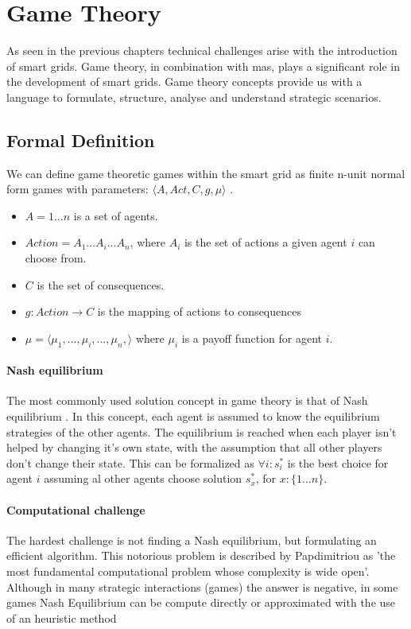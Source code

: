 \section{Game Theory}
As seen in the previous chapters technical challenges arise with the introduction of smart grids. Game theory, in combination with \gls{mas}, plays a significant role in the development of smart grids. Game theory concepts provide us with a language to formulate, structure, analyse and understand strategic scenarios.

\subsection{Formal Definition}
We can define game theoretic games within the smart grid as finite n-unit normal form games with parameters: $\langle A,Act,C,g,\mu \rangle$ \cite{CourseInGameTheory}. \\
\begin{itemize}
    \item $A = {1 ... n }$ is a set of agents.
    \item $Action = A_{1} ... A_{i} ... A_{n}$, where $A_{i}$ is the set of actions a given agent $i$ can choose from.
    \item $C$ is the set of consequences.
    \item $g: Action \to C$ is the mapping of actions to consequences
    \item $\mu = \langle \mu_{1}, ..., \mu_{i}, ..., \mu_{n}, \rangle $ where $\mu_{i}$ is a payoff function for agent $i$.
\end{itemize}


\paragraph{Nash equilibrium} 
The most commonly used solution concept in game theory is that of Nash equilibrium \cite{CourseInGameTheory}. In this concept, each agent is assumed to know the equilibrium strategies of the other agents. The equilibrium is reached when each player isn't helped by changing it's own state, with the assumption that all other players don't change their state. 
This can be formalized as $\forall i: s^{*}_{i}$ is the best choice for agent $i$ assuming al other agents choose solution $s^{*}_{x}$, for $x : \{1...n\}$. 

\paragraph{Computational challenge}
The hardest challenge is not finding a Nash equilibrium, but formulating an efficient algorithm. This notorious problem is described by Papdimitriou as 'the most fundamental computational problem whose complexity is wide open'\cite{daskalakis2009complexity}. Although in many strategic interactions (games) the answer is negative, in some games Nash Equilibrium can be compute directly or approximated with the use of an heuristic method\cite{MicrogridModellingPetrosAristidou,AumannGameTheoryAccomplish} 

